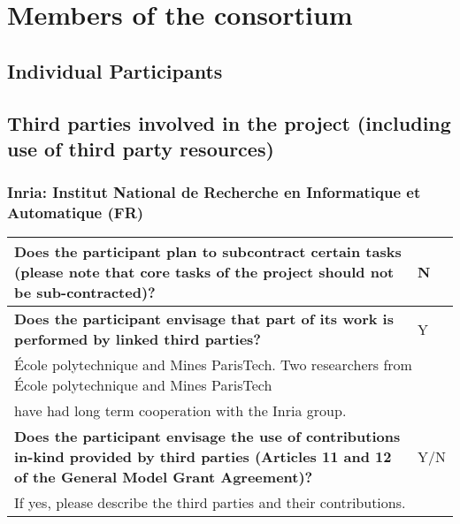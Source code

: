 \chapter{Members of the consortium}

\section{Individual Participants}
\label{sec:partners}






























\section{Third parties involved in the project (including use of third party resources)}

\subsection{Inria: Institut National de Recherche en Informatique et
  Automatique (FR)}

\begin{longtable}{|p{}|p{}|}
\hline
{\bf Does the participant plan to subcontract certain tasks (please
  note that core tasks of the project should not be sub-contracted)?}
&
N
\\
\hline
{\bf Does the participant envisage that  part of its work is performed
  by linked third parties?}
&
Y
\\
\hline
\multicolumn{2}{|l|}{

  École polytechnique and Mines ParisTech.
  Two researchers from École polytechnique and  Mines ParisTech}\\
\multicolumn{2}{|l|}{

  have had long term cooperation with the Inria group.}
\\
\hline
{\bf Does the participant envisage the use of contributions in-kind
provided by third parties (Articles 11 and 12 of the General Model
Grant Agreement)?}
&
Y/N
\\
\hline
\multicolumn{2}{|l|}{
If yes, please describe the third parties and their contributions.}
\\
\hline
\end{longtable}

